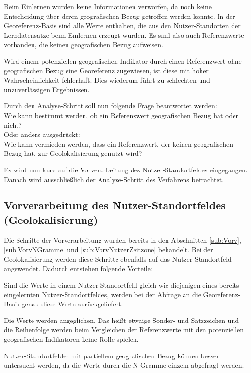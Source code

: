 		Beim Einlernen wurden keine Informationen verworfen, da noch keine Entscheidung über deren geografischen Bezug getroffen werden konnte.
		In der Georeferenz-Basis sind alle Werte enthalten, die aus den Nutzer-Standorten der Lerndatensätze beim Einlernen erzeugt wurden.
		Es sind also auch Referenzwerte vorhanden, die keinen geografischen Bezug aufweisen.
		
		Wird einem potenziellen geografischen Indikator durch einen Referenzwert ohne geografischen Bezug eine Georeferenz zugewiesen, ist diese mit hoher Wahrscheinlichkeit fehlerhaft.
		Dies wiederum führt zu schlechten und unzuverlässigen Ergebnissen.

		Durch den Analyse-Schritt soll nun folgende Frage beantwortet werden: 
		\\ Wie kann bestimmt werden, ob ein Referenzwert geografischen Bezug hat oder nicht? \\
		Oder anders ausgedrückt: 
		\\ Wie kann vermieden werden, dass ein Referenzwert, der keinen geografischen Bezug hat, zur Geolokalisierung genutzt wird?

		Es wird nun kurz auf die Vorverarbeitung des Nutzer-Standortfeldes eingegangen.
		Danach wird ausschließlich der Analyse-Schritt des Verfahrens betrachtet.

		\subsection{Vorverarbeitung des Nutzer-Standortfeldes (Geolokalisierung)}

			Die Schritte der Vorverarbeitung wurden bereits in den Abschnitten \ref{sub:Vorv}, \ref{sub:VorvNGramme} und \ref{sub:VorvNutzerZeitzone} behandelt. 
			Bei der Geolokalisierung werden diese Schritte ebenfalls auf das Nutzer-Standortfeld angewendet.
			Dadurch entstehen folgende Vorteile:

			Sind die Werte in einem Nutzer-Standortfeld gleich wie diejenigen eines bereits eingelernten Nutzer-Standortfeldes, werden bei der Abfrage an die Georeferenz-Basis genau diese Werte zurückgeliefert.

			Die Werte werden angeglichen. 
			Das heißt etwaige Sonder- und Satzzeichen und die Reihenfolge werden beim Vergleichen der Referenzwerte mit den potenziellen geografischen Indikatoren keine Rolle spielen.
			
			Nutzer-Standortfelder mit partiellem geografischen Bezug können besser untersucht werden, da die Werte durch die N-Gramme einzeln abgefragt werden.

